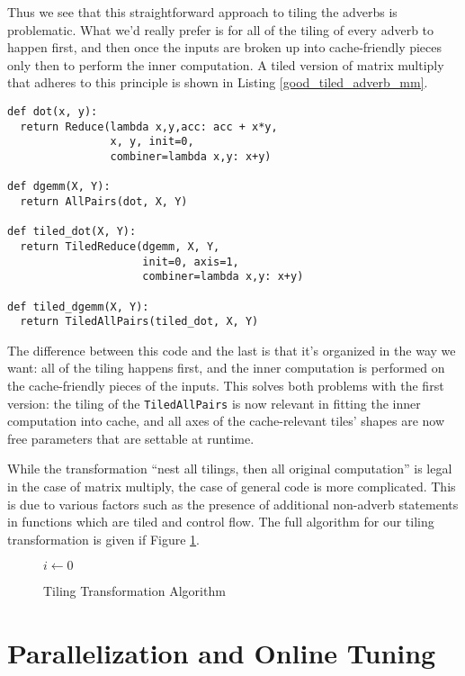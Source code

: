 \documentclass[preprint,9pt]{sigplanconf}
\begin{document}
Thus we see that this straightforward approach to tiling the adverbs is problematic.  What we'd really prefer is for all of the tiling of every adverb to happen first, and then once the inputs are broken up into cache-friendly pieces only then to perform the inner computation.  A tiled version of matrix multiply that adheres to this principle is shown in Listing \ref{good_tiled_adverb_mm}.

\begin{lstlisting}[label=good_tiled_adverb_mm, caption={Good Tiled Matrix Multiply}, belowskip=0.5em]
def dot(x, y):
  return Reduce(lambda x,y,acc: acc + x*y,
                x, y, init=0,
                combiner=lambda x,y: x+y)

def dgemm(X, Y):
  return AllPairs(dot, X, Y)

def tiled_dot(X, Y):
  return TiledReduce(dgemm, X, Y,
                     init=0, axis=1,
                     combiner=lambda x,y: x+y)
                     
def tiled_dgemm(X, Y):
  return TiledAllPairs(tiled_dot, X, Y)
\end{lstlisting}

The difference between this code and the last is that it's organized in the way we want: all of the tiling happens first, and the inner computation is performed on the cache-friendly pieces of the inputs. This solves both problems with the first version: the tiling of the \lstinline{TiledAllPairs} is now relevant in fitting the inner computation into cache, and all axes of the cache-relevant tiles' shapes are now free parameters that are settable at runtime.

While the transformation ``nest all tilings, then all original computation'' is legal in the case of matrix multiply, the case of general code is more complicated.  This is due to various factors such as the presence of additional non-adverb statements in functions which are tiled and control flow.  The full algorithm for our tiling transformation is given if Figure \ref{tiling_algorithm}.

\begin{figure}
\begin{algorithmic}
  \State $i\gets 0$
\EndIf
\end{algorithmic}
\caption{Tiling Transformation Algorithm}
\label{tiling_algorithm}
\end{figure}

\section{Parallelization and Online Tuning}
\label{online_tuning}
\end{document}
